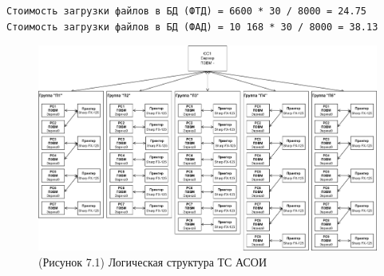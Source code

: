 \documentclass[12pt, a4paper, simple]{eskdtext}
\begin{document}
\begin{lstlisting}[language=MyFormula]
Стоимость загрузки файлов в БД (ФТД) = 6600 * 30 / 8000 = 24.75
Стоимость загрузки файлов в БД (ФАД) = 10 168 * 30 / 8000 = 38.13
\end{lstlisting}

    \newpage

    \begin{figure}[h!]
        \centering
        \includegraphics[width=16cm]
            {_docs/ЛогическаяСтруктураТСАСОИ.png}
        \caption{(Рисунок 7.1) Логическая структура ТС АСОИ}
    \end{figure}


%     



\end{document}
